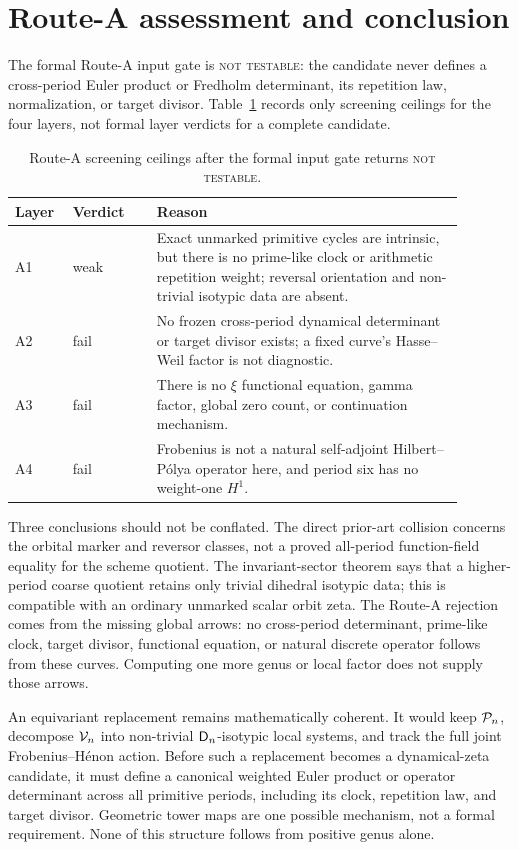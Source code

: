 \section{Route-A assessment and conclusion}\label{sec:routea}

The formal Route-A input gate is \textsc{not testable}: the candidate never
defines a cross-period Euler product or Fredholm determinant, its repetition
law, normalization, or target divisor.  Table~\ref{tab:routea} records only
screening ceilings for the four layers, not formal layer verdicts for a
complete candidate.

\begin{table}[h]
\centering
\small
\begin{tabular}{p{0.10\linewidth}p{0.17\linewidth}p{0.62\linewidth}}
\toprule
Layer & Verdict & Reason \\
\midrule
A1 & weak & Exact unmarked primitive cycles are intrinsic, but there is no prime-like clock or arithmetic repetition weight; reversal orientation and non-trivial isotypic data are absent. \\
A2 & fail & No frozen cross-period dynamical determinant or target divisor exists; a fixed curve's Hasse--Weil factor is not diagnostic. \\
A3 & fail & There is no $\xi$ functional equation, gamma factor, global zero count, or continuation mechanism. \\
A4 & fail & Frobenius is not a natural self-adjoint Hilbert--P\'olya operator here, and period six has no weight-one $H^1$. \\
\bottomrule
\end{tabular}
\caption{Route-A screening ceilings after the formal input gate returns
\textsc{not testable}.}
\label{tab:routea}
\end{table}

Three conclusions should not be conflated.  The direct prior-art collision
concerns the orbital marker and reversor classes, not a proved all-period
function-field equality for the scheme quotient.  The invariant-sector
theorem says that a higher-period coarse quotient retains only trivial
dihedral isotypic data; this is compatible with an ordinary unmarked scalar
orbit zeta.  The Route-A rejection comes from the missing global arrows: no
cross-period determinant, prime-like clock, target divisor, functional
equation, or natural discrete operator follows from these curves.  Computing
one more genus or local factor does not supply those arrows.

An equivariant replacement remains mathematically coherent.  It would keep
$\mathcal P_n$, decompose $\mathcal V_n$ into non-trivial $\mathsf D_n$-isotypic local systems, and track
the full joint Frobenius--H\'enon action.  Before such a replacement becomes a
dynamical-zeta candidate, it must define a canonical weighted Euler product or
operator determinant across all primitive periods, including its clock,
repetition law, and target divisor.  Geometric tower maps are one possible
mechanism, not a formal requirement.  None of this structure follows from
positive genus alone.

